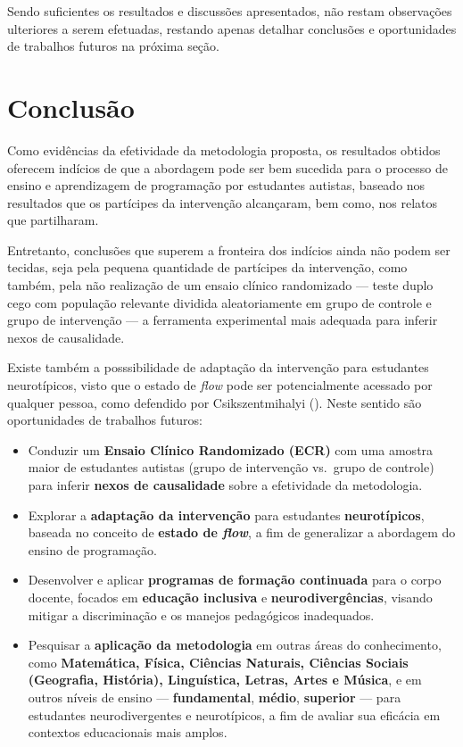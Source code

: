 \documentclass[
  12pt,
  a4paper,
]{article}
\providecommand{\tightlist}{%
  \setlength{\itemsep}{0pt}\setlength{\parskip}{0pt}}
\begin{document}
Sendo suficientes os resultados e discussões apresentados, não restam
observações ulteriores a serem efetuadas, restando apenas detalhar
conclusões e oportunidades de trabalhos futuros na próxima seção.

\section{Conclusão}\label{sec:conclusao}

Como evidências da efetividade da metodologia proposta, os resultados
obtidos oferecem indícios de que a abordagem pode ser bem sucedida para
o processo de ensino e aprendizagem de programação por estudantes
autistas, baseado nos resultados que os partícipes da intervenção
alcançaram, bem como, nos relatos que partilharam.

Entretanto, conclusões que superem a fronteira dos indícios ainda não
podem ser tecidas, seja pela pequena quantidade de partícipes da
intervenção, como também, pela não realização de um ensaio clínico
randomizado --- teste duplo cego com população relevante dividida
aleatoriamente em grupo de controle e grupo de intervenção --- a
ferramenta experimental mais adequada para inferir nexos de causalidade.

Existe também a posssibilidade de adaptação da intervenção para
estudantes neurotípicos, visto que o estado de \emph{flow} pode ser
potencialmente acessado por qualquer pessoa, como defendido por
Csikszentmihalyi (). Neste
sentido são oportunidades de trabalhos futuros:

\begin{itemize}
\tightlist
\item
  Conduzir um \textbf{Ensaio Clínico Randomizado (ECR)} com uma amostra
  maior de estudantes autistas (grupo de intervenção vs.~grupo de
  controle) para inferir \textbf{nexos de causalidade} sobre a
  efetividade da metodologia.
\item
  Explorar a \textbf{adaptação da intervenção} para estudantes
  \textbf{neurotípicos}, baseada no conceito de \textbf{estado de
  \emph{flow}}, a fim de generalizar a abordagem do ensino de
  programação.
\item
  Desenvolver e aplicar \textbf{programas de formação continuada} para o
  corpo docente, focados em \textbf{educação inclusiva} e
  \textbf{neurodivergências}, visando mitigar a discriminação e os
  manejos pedagógicos inadequados.
\item
  Pesquisar a \textbf{aplicação da metodologia} em outras áreas do
  conhecimento, como \textbf{Matemática, Física, Ciências Naturais,
  Ciências Sociais (Geografia, História), Linguística, Letras, Artes e
  Música}, e em outros níveis de ensino --- \textbf{fundamental},
  \textbf{médio}, \textbf{superior} --- para estudantes neurodivergentes
  e neurotípicos, a fim de avaliar sua eficácia em contextos
  educacionais mais amplos.
\end{itemize}
\end{document}
